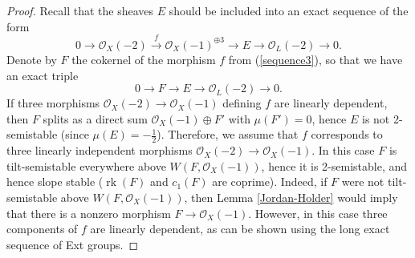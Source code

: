 \documentclass{amsart}
\DeclareMathOperator{\rk}{{rk}}
\begin{document}
\begin{proof}Recall that the sheaves $E$ should be included into an exact sequence of the form
\begin{equation}\label{sequence3}0\to\mathcal O_X(-2)\overset{f}{\to}\mathcal O_X(-1)^{\oplus 3}\to E\to\mathcal O_L(-2)\to 0.\end{equation}
Denote by $F$ the cokernel of the morphism $f$ from (\ref{sequence3}), so that we have an exact triple
	\begin{equation}\label{F L}0\to F\to E\to \mathcal O_L(-2)\to 0.\end{equation}
	If three morphisms $\mathcal O_X(-2)\to\mathcal O_X(-1)$ defining $f$ are linearly dependent, then $F$ splits as a direct sum $\mathcal O_X(-1)\oplus F'$ with $\mu(F')=0$, hence $E$ is not 2-semistable (since $\mu(E)=-\frac 12$). Therefore, we assume that $f$ corresponds to three linearly independent morphisms $\mathcal O_X(-2)\to\mathcal O_X(-1)$. In this case $F$ is tilt-semistable everywhere above $W(F,\mathcal O_X(-1))$, hence it is 2-semistable, and hence slope stable ($\rk(F)$ and $c_1(F)$ are coprime). Indeed, if $F$ were not tilt-semistable above $W(F,\mathcal O_X(-1))$, then Lemma \ref{Jordan-Holder} would imply that there is a nonzero morphism $F\to\mathcal O_X(-1)$. However, in this case three components of $f$ are linearly dependent, as can be shown using the long exact sequence of Ext groups.
	

\end{proof}
\end{document}

